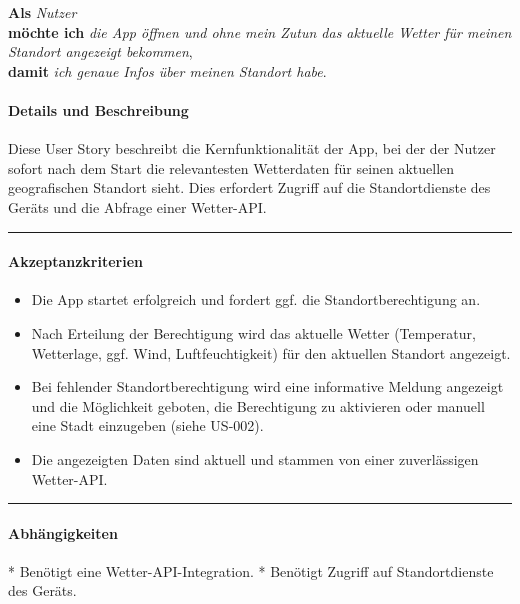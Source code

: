 \documentclass{article}
\begin{document}
\vspace{0.5em}

\textcolor{storygreen}{\textbf{Als}} \textit{Nutzer} \\
\textcolor{storygreen}{\textbf{möchte ich}} \textit{die App öffnen und ohne mein Zutun das aktuelle Wetter für meinen Standort angezeigt bekommen}, \\
\textcolor{storygreen}{\textbf{damit}} \textit{ich genaue Infos über meinen Standort habe}.

\vspace{1em}

\paragraph{Details und Beschreibung}
Diese User Story beschreibt die Kernfunktionalität der App, bei der der Nutzer sofort nach dem Start die relevantesten Wetterdaten für seinen aktuellen geografischen Standort sieht. Dies erfordert Zugriff auf die Standortdienste des Geräts und die Abfrage einer Wetter-API.

\vspace{0.5em}
\hrule

\paragraph{Akzeptanzkriterien}
\begin{itemize}
    \item Die App startet erfolgreich und fordert ggf. die Standortberechtigung an.
    \item Nach Erteilung der Berechtigung wird das aktuelle Wetter (Temperatur, Wetterlage, ggf. Wind, Luftfeuchtigkeit) für den aktuellen Standort angezeigt.
    \item Bei fehlender Standortberechtigung wird eine informative Meldung angezeigt und die Möglichkeit geboten, die Berechtigung zu aktivieren oder manuell eine Stadt einzugeben (siehe US-002).
    \item Die angezeigten Daten sind aktuell und stammen von einer zuverlässigen Wetter-API.
\end{itemize}

\vspace{0.5em}
\hrule

\paragraph{Abhängigkeiten}
* Benötigt eine Wetter-API-Integration.
* Benötigt Zugriff auf Standortdienste des Geräts.
\end{document}
